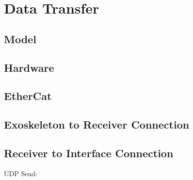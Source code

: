 \section{Data Transfer}
\subsection{Model}
\subsection{Hardware}
\subsection{EtherCat}
\subsection{Exoskeleton to Receiver Connection}
\subsection{Receiver to Interface Connection}
UDP Send: \cite{web:UDPSend}